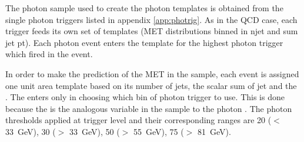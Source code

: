 The photon sample used to create the photon templates is obtained from the single photon triggers 
listed in appendix \ref{app:photrig}. As in the QCD case, each trigger feeds its own set of templates 
(MET distributions binned in njet and sum jet pt).
Each photon event enters the template for the
highest \pt photon trigger which fired in the event. 

In order to make the prediction of the MET in the \Z sample, each \Z event is assigned one unit 
area template based on its number of jets, the scalar sum of jet \pt and the \Z \pt. 
The \Z \pt enters only in choosing which bin of photon trigger to use. 
This is done because the \Z \pt is the analogous variable in the \Z sample 
to the photon \pt. 
The photon \pt thresholds applied at trigger level and their corresponding \Z \pt ranges are 
20 (\Z \pt $<$ 33~GeV), 30 (\Z \pt $>$ 33~GeV), 50 (\Z \pt $>$ 55~GeV), 75 (\Z \pt $>$ 81~GeV).



